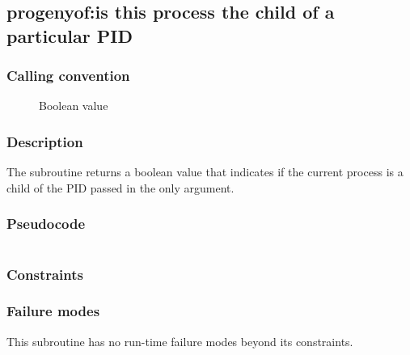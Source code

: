 \clearpage
{}
{}
\label{insn:dummy}
\subsection*{progenyof:is this process the child of a particular PID}

\subsubsection*{Calling convention}

\begin{description}
\item[] Boolean value
\end{description}

\subsubsection*{Description}

The  subroutine returns a boolean value that
indicates if the current process is a child of the PID passed in the
only argument.
\subsubsection*{Pseudocode}

\begin{verbatim}
\end{verbatim}

\subsubsection*{Constraints}

\subsubsection*{Failure modes}

This subroutine has no run-time failure modes beyond its constraints.
